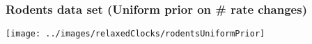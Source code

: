 \begin{frame}
\frametitle{Rodents data set (Uniform prior on \# rate changes)}

\begin{centering}

\texttt{[image: ../images/relaxedClocks/rodentsUniformPrior]}

\end{centering}

\end{frame}